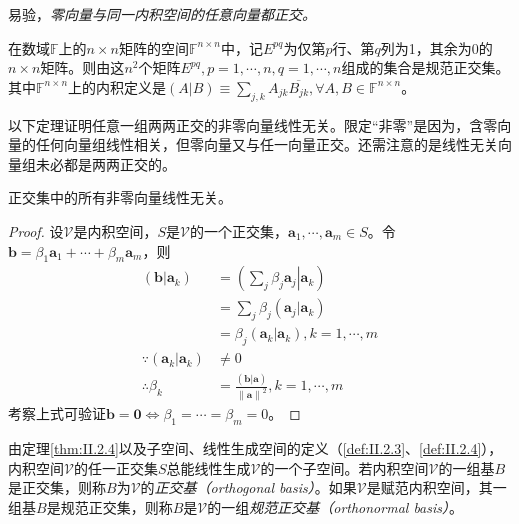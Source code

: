 \documentclass[../main.tex]{subfiles}
\begin{document}
易验，\emph{零向量与同一内积空间的任意向量都正交。}

\begin{example}\label{exp:II.2.6}\cite[\S 7.2 例题2.2]{周胜林2012线性代数}
    在数域$\mathbb{F}$上的$n\times n$矩阵的空间$\mathbb{F}^{n\times n}$中，记$E^{pq}$为仅第$p$行、第$q$列为1，其余为0的$n\times n$矩阵。则由这$n^2$个矩阵$E^{pq},p=1,\cdots,n,q=1,\cdots,n$组成的集合是规范正交集。其中$\mathbb{F}^{n\times n}$上的内积定义是$\left(A|B\right)\equiv\sum_{j,k}A_{jk}\overline{B_{jk}},\forall A, B\in\mathbb{F}^{n\times n}$。
\end{example}

以下定理证明任意一组两两正交的非零向量线性无关。限定“非零”是因为，含零向量的任何向量组线性相关，但零向量又与任一向量正交。还需注意的是线性无关向量组未必都是两两正交的。

\begin{theorem}\label{thm:II.2.4}
    正交集中的所有非零向量线性无关。
\end{theorem}
\begin{proof}
    设$\mathcal{V}$是内积空间，$S$是$\mathcal{V}$的一个正交集，$\mathbf{a}_1,\cdots,\mathbf{a}_m\in S$。令$\mathbf{b}=\beta_1\mathbf{a}_1+\cdots+\beta_m\mathbf{a}_m$，则
    \begin{align*}
        \left(\mathbf{b}|\mathbf{a}_k\right)            & =\left(\left.\sum_j\beta_j\mathbf{a}_j\right|\left.\mathbf{a}_k\right.\right)        \\
                                                        & =\sum_j\beta_j\left(\mathbf{a}_j|\mathbf{a}_k\right)                                 \\
                                                        & =\beta_j\left(\mathbf{a}_k|\mathbf{a}_k\right),k=1,\cdots,m                          \\
        \because \left(\mathbf{a}_k|\mathbf{a}_k\right) & \neq 0                                                                               \\
        \therefore \beta_k                              & =\frac{\left(\mathbf{b}|\mathbf{a}\right)}{\left\|\mathbf{a}\right\|^2},k=1,\cdots,m
    \end{align*}
    考察上式可验证$\mathbf{b}=\mathbf{0}\Leftrightarrow\beta_1=\cdots=\beta_m=0$。
\end{proof}

由定理\ref{thm:II.2.4}以及子空间、线性生成空间的定义（\ref{def:II.2.3}、\ref{def:II.2.4}），内积空间$\mathcal{V}$的任一正交集$S$总能线性生成$\mathcal{V}$的一个子空间。若内积空间$\mathcal{V}$的一组基$B$是正交集，则称$B$为$\mathcal{V}$的\emph{正交基（orthogonal basis）}。如果$\mathcal{V}$是赋范内积空间，其一组基$B$是规范正交集，则称$B$是$\mathcal{V}$的一组\emph{规范正交基（orthonormal basis）}。
\end{document}
